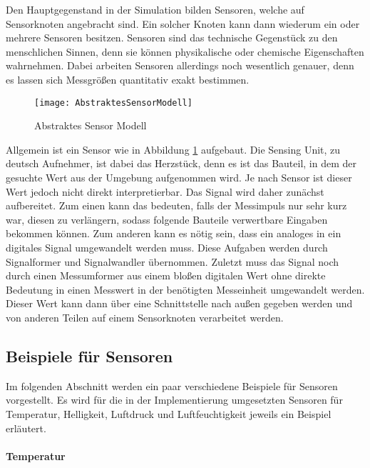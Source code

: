 Den Hauptgegenstand in der Simulation bilden Sensoren, welche auf Sensorknoten angebracht sind. Ein solcher Knoten kann dann wiederum ein oder mehrere Sensoren besitzen.\newline
Sensoren sind das technische Gegenstück zu den menschlichen Sinnen, denn sie können physikalische oder chemische Eigenschaften wahrnehmen. Dabei arbeiten Sensoren allerdings noch wesentlich genauer, denn es lassen sich Messgrößen quantitativ exakt bestimmen.\newline

\begin{figure}[htbp]
\centering
\caption{Abstraktes Sensor Modell}
\label{fig:AbstraktesSensorModell}
\texttt{[image: AbstraktesSensorModell]}
\end{figure}

Allgemein ist ein Sensor wie in Abbildung \ref{fig:AbstraktesSensorModell} aufgebaut. Die Sensing Unit, zu deutsch Aufnehmer, ist dabei das Herzstück, denn es ist das Bauteil, in dem der gesuchte Wert aus der Umgebung aufgenommen wird. Je nach Sensor ist dieser Wert jedoch nicht direkt interpretierbar. Das Signal wird daher zunächst aufbereitet. Zum einen kann das bedeuten, falls der Messimpuls nur sehr kurz war, diesen zu verlängern, sodass folgende Bauteile verwertbare Eingaben bekommen können. Zum anderen kann es nötig sein, dass ein analoges in ein digitales Signal umgewandelt werden muss. Diese Aufgaben werden durch Signalformer und Signalwandler übernommen.\newline
Zuletzt muss das Signal noch durch einen Messumformer aus einem bloßen digitalen Wert ohne direkte Bedeutung in einen Messwert in der benötigten Messeinheit umgewandelt werden. Dieser Wert kann dann über eine Schnittstelle nach außen gegeben werden und von anderen Teilen auf einem Sensorknoten verarbeitet werden.

\subsection*{Beispiele für Sensoren}

Im folgenden Abschnitt werden ein paar verschiedene Beispiele für Sensoren vorgestellt. Es wird für die in der Implementierung umgesetzten Sensoren für Temperatur, Helligkeit, Luftdruck und Luftfeuchtigkeit jeweils ein Beispiel erläutert.

\paragraph{Temperatur}

